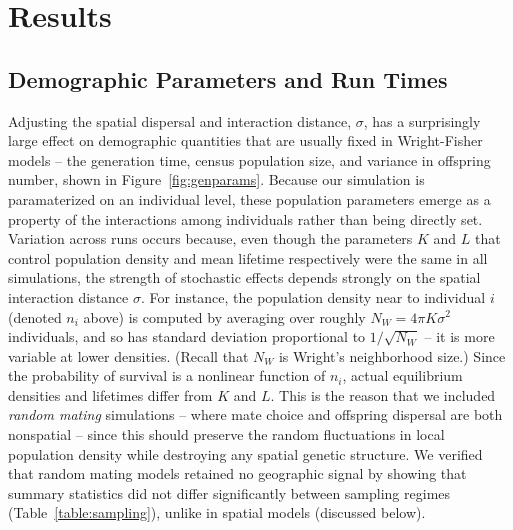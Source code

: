 \documentclass[10pt,twoside,lineno,hidelinks]{preprint}
\begin{document}
\section{Results}

\subsection{Demographic Parameters and Run Times}

Adjusting the spatial dispersal and interaction distance, $\sigma$,
has a surprisingly large effect on demographic quantities that are usually fixed in Wright-Fisher models --
the generation time, census population size, and variance in offspring number, shown in Figure~\ref{fig:genparams}. Because our simulation is paramaterized on an individual level, these population parameters emerge as a property of the interactions among individuals rather than being directly set. 
Variation across runs occurs because,
even though the parameters $K$ and $L$ that control population density and mean lifetime respectively  
were the same in all simulations,
the strength of stochastic effects depends strongly on the spatial interaction distance $\sigma$.
For instance, 
the population density near to individual $i$ (denoted $n_i$ above)
is computed by averaging over roughly $N_W = 4 \pi K \sigma^2$ individuals,
and so has standard deviation proportional to $1/\sqrt{N_W}$ --
it is more variable at lower densities.
(Recall that $N_W$ is Wright's neighborhood size.)
Since the probability of survival is a nonlinear function of $n_i$,
actual equilibrium densities and lifetimes differ from $K$ and $L$.
This is the reason that we included \emph{random mating} simulations --
where mate choice and offspring dispersal are both nonspatial --
since this should preserve the random fluctuations in local population density
while destroying any spatial genetic structure.
We verified that random mating models retained no geographic signal
by showing that summary statistics did not differ significantly between sampling regimes
(Table~\ref{table:sampling}), unlike in spatial models (discussed below).
\end{document}
